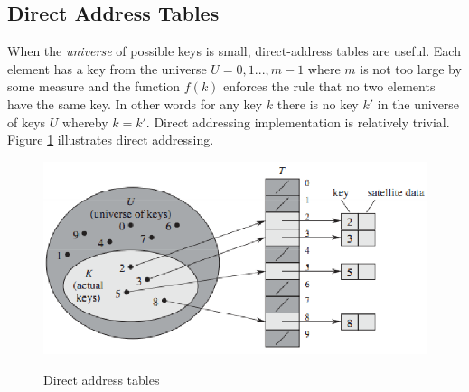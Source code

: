 \documentclass[10pt,a4paper]{article}
\begin{document}
\subsection{Direct Address Tables}
When the {\it universe} of possible keys is small, direct-address tables are useful. Each element has a key from the universe $U={0,1...,m-1}$ where $m$ is not too large by some measure and the function $f(k)$ enforces the rule that no two elements have the same key. In other words for any key $k$ there is no key $k'$ in the universe of keys $U$ whereby $k=k'$. Direct addressing implementation is relatively trivial. Figure \ref{diraddr} illustrates direct addressing. 

\begin{figure}
\caption{Direct address tables \cite{INTROALG}}
\begin{center}
\includegraphics[scale=0.43]{../images/directaddtables.png}
\label{diraddr}
\end{center}
\end{figure}
\end{document}
